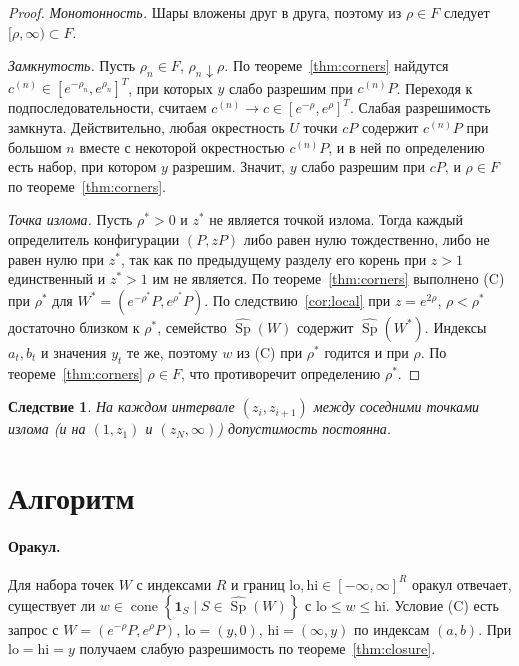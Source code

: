 \documentclass[a4paper,11pt]{article}
\theoremstyle{plain}
\newtheorem{corollary}[theorem]{Следствие}
\theoremstyle{definition}
\theoremstyle{remark}
\newcommand{\set}[1]{\left\{ #1 \right\}}
\DeclareMathOperator{\cone}{cone}
\DeclareMathOperator{\Sp}{Sp}
\begin{document}
\begin{proof}
    \emph{Монотонность.} Шары вложены друг в друга, поэтому из $\rho\in F$ следует $[\rho,\infty)\subset F$.

    \emph{Замкнутость.} Пусть $\rho_n\in F$, $\rho_n\downarrow\rho$. По теореме~\ref{thm:corners} найдутся $c^{(n)}\in[e^{-\rho_n},e^{\rho_n}]^T$, при которых $y$ слабо разрешим при $c^{(n)}P$. Переходя к подпоследовательности, считаем $c^{(n)}\to c\in[e^{-\rho},e^{\rho}]^T$. Слабая разрешимость замкнута. Действительно, любая окрестность $U$ точки $cP$ содержит $c^{(n)}P$ при большом $n$ вместе с некоторой окрестностью $c^{(n)}P$, и в ней по определению есть набор, при котором $y$ разрешим. Значит, $y$ слабо разрешим при $cP$, и $\rho\in F$ по теореме~\ref{thm:corners}.

    \emph{Точка излома.} Пусть $\rho^*>0$ и $z^*$ не является точкой излома. Тогда каждый определитель конфигурации $(P,zP)$ либо равен нулю тождественно, либо не равен нулю при $z^*$, так как по предыдущему разделу его корень при $z>1$ единственный и $z^*>1$ им не является. По теореме~\ref{thm:corners} выполнено (C) при $\rho^*$ для $W^*=(e^{-\rho^*}P,e^{\rho^*}P)$. По следствию~\ref{cor:local} при $z=e^{2\rho}$, $\rho<\rho^*$ достаточно близком к $\rho^*$, семейство $\widehat{\Sp}(W)$ содержит $\widehat{\Sp}(W^*)$. Индексы $a_t,b_t$ и значения $y_t$ те же, поэтому $w$ из (C) при $\rho^*$ годится и при $\rho$. По теореме~\ref{thm:corners} $\rho\in F$, что противоречит определению $\rho^*$.
\end{proof}

\begin{corollary}\label{cor:gap}
    На каждом интервале $(z_i,z_{i+1})$ между соседними точками излома (и на $(1,z_1)$ и $(z_N,\infty)$) допустимость постоянна.
\end{corollary}

\section{Алгоритм}

\paragraph{Оракул.} Для набора точек $W$ с индексами $R$ и границ $\mathrm{lo},\mathrm{hi}\in[-\infty,\infty]^R$ оракул отвечает, существует ли $w\in\cone\set{\mathbf 1_S\mid S\in\widehat{\Sp}(W)}$ с $\mathrm{lo}\le w\le\mathrm{hi}$. Условие (C) есть запрос с $W=(e^{-\rho}P,e^{\rho}P)$, $\mathrm{lo}=(y,0)$, $\mathrm{hi}=(\infty,y)$ по индексам $(a,b)$. При $\mathrm{lo}=\mathrm{hi}=y$ получаем слабую разрешимость по теореме~\ref{thm:closure}.
\end{document}

